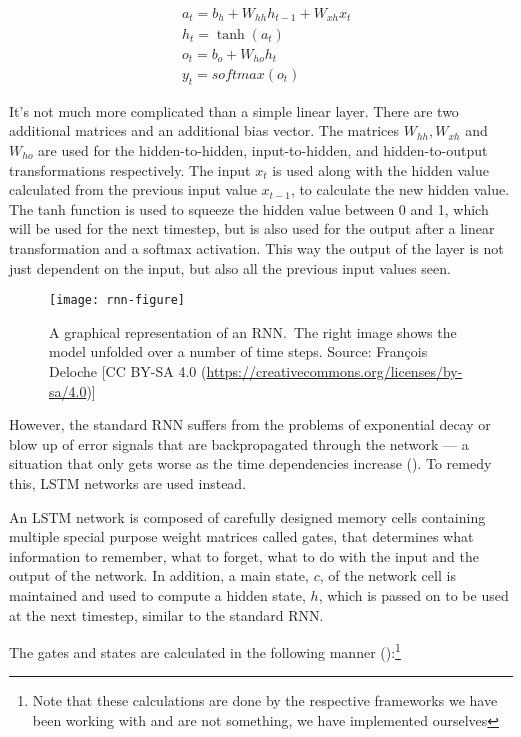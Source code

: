 \begin{align*}
    & a_t = b_h + W_{hh} h_{t-1} + W_{xh} x_t \\
    & h_t = \tanh(a_t) \\
    & o_t = b_o + W_{ho} h_t \\
    & y_t = softmax(o_t)
\end{align*}

It's not much more complicated than a simple linear layer. There are two
additional matrices and an additional bias vector. The matrices $W_{hh}, W_{xh}$
and $W_{ho}$ are used for the hidden-to-hidden, input-to-hidden, and
hidden-to-output transformations respectively. The input $x_t$ is used along
with the hidden value calculated from the previous input value $x_{t-1}$, to
calculate the new hidden value. The tanh function is used to squeeze the hidden
value between 0 and 1, which will be used for the next timestep, but is also
used for the output after a linear transformation and a softmax activation. This
way the output of the layer is not just dependent on the input, but also all the
previous input values seen.

\begin{figure}[h]
    \texttt{[image: rnn-figure]}
    \caption{A graphical representation of an RNN.\ The right image shows the
    model unfolded over a number of time steps. Source: François Deloche [CC BY-SA
    4.0 (\url{https://creativecommons.org/licenses/by-sa/4.0})]
    }\label{fig:rnn}
\end{figure}

However, the standard RNN suffers from the problems of exponential decay or blow
up of error signals that are backpropagated through the network --- a situation
that only gets worse as the time dependencies increase
(\cite{hochreiter2001gradient}). To remedy this, LSTM networks are used instead.

An LSTM network is composed of carefully designed memory cells containing
multiple special purpose weight matrices called gates, that determines what
information to remember, what to forget, what to do with the input and the
output of the network. In addition, a main state, $c$, of the network cell is
maintained and used to compute a hidden state, $h$, which is passed on to be
used at the next timestep, similar to the standard RNN.\

The gates and states are calculated in the following manner
(\cite{huang2015bidirectional}):\footnote{Note that
    these calculations are done by the respective frameworks we have been
working with and are not something, we have implemented ourselves}



